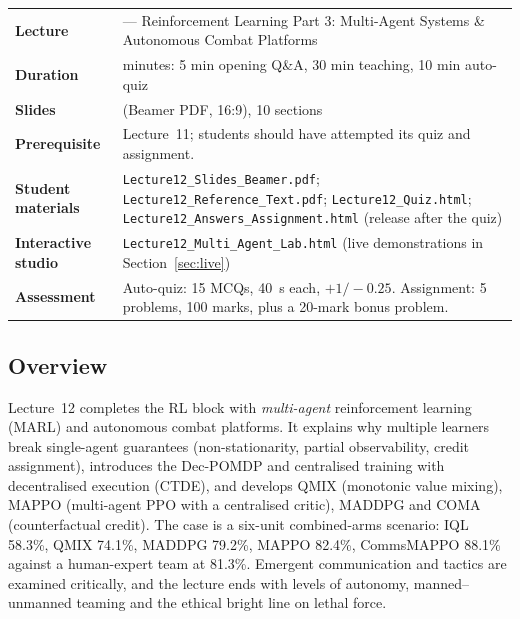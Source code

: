 \documentclass[11pt]{article}
\begin{document}
\begin{center}\small\renewcommand{\arraystretch}{1.25}\begin{tabularx}{\textwidth}{@{}>{\bfseries}p{3.3cm}>{\raggedright\arraybackslash}X@{}}\toprule

\textcolor{NavyN}{Lecture}&12 --- Reinforcement Learning Part 3: Multi-Agent Systems \& Autonomous Combat Platforms\\
\textcolor{NavyN}{Duration}&45 minutes: 5 min opening Q\&A, 30 min teaching, 10 min auto-quiz\\
\textcolor{NavyN}{Slides}&20 (Beamer PDF, 16:9), 10 sections\\
\textcolor{NavyN}{Prerequisite}&Lecture~11; students should have attempted its quiz and assignment.\\
\textcolor{NavyN}{Student materials}&\texttt{Lecture12\_Slides\_Beamer.pdf}; \texttt{Lecture12\_Reference\_Text.pdf}; \texttt{Lecture12\_Quiz.html}; \texttt{Lecture12\_Answers\_Assignment.html} (release after the quiz)\\
\textcolor{NavyN}{Interactive studio}&\texttt{Lecture12\_Multi\_Agent\_Lab.html} (live demonstrations in Section~\ref{sec:live})\\
\textcolor{NavyN}{Assessment}&Auto-quiz: 15 MCQs, 40~s each, $+1/-0.25$. Assignment: 5 problems, 100 marks, plus a 20-mark bonus problem.\\\bottomrule\end{tabularx}\end{center}

\subsection*{Overview}Lecture~12 completes the RL block with \emph{multi-agent} reinforcement learning (MARL) and autonomous combat platforms. It explains why multiple learners break single-agent guarantees (non-stationarity, partial observability, credit assignment), introduces the Dec-POMDP and centralised training with decentralised execution (CTDE), and develops QMIX (monotonic value mixing), MAPPO (multi-agent PPO with a centralised critic), MADDPG and COMA (counterfactual credit). The case is a six-unit combined-arms scenario: IQL 58.3\%, QMIX 74.1\%, MADDPG 79.2\%, MAPPO 82.4\%, CommsMAPPO 88.1\% against a human-expert team at 81.3\%. Emergent communication and tactics are examined critically, and the lecture ends with levels of autonomy, manned--unmanned teaming and the ethical bright line on lethal force.
\end{document}
